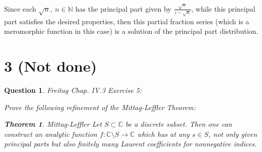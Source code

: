 \documentclass{article}
\newtheorem{theorem}{Theorem}
\newtheorem{question}{Question}
\begin{document}
\hfil

Since each $\sqrt{n},\ n\in\mathbb{N}$ has the principal part given by $\frac{\sqrt{n}}{z-\sqrt{n}}$, while this principal part satisfies the desired properties, then this partial fraction series (which is a meromorphic function in this case) is a solution of the principal part distribution.

\begin{comment}
\hfil

Lastly, given the above partial fraction series, it only has simple poles at all $\sqrt{n}$ (where $n\in\mathbb{N}$); also, if we analyze the residue at each point, we get:
$$\forall v\in \mathbb{N},\quad f(z)=\sum_{n=1}^{\infty}\left(\frac{\sqrt{n}}{z-\sqrt{n}}+\sum_{k=0}^{3}\left(\frac{z}{\sqrt{n}}\right)^k\right) = \frac{\sqrt{v}}{z-\sqrt{v}}+\sum_{k=0}^{3}\left(\frac{z}{\sqrt{v}}\right)^k+\sum_{n=1,n\neq v}^{\infty}\left(\frac{\sqrt{n}}{z-\sqrt{n}}+\sum_{k=0}^{3}\left(\frac{z}{\sqrt{n}}\right)^k\right)$$

$$Res(f(z);\sqrt{v})=\lim_{z\rightarrow\sqrt{v}}(z-\sqrt{v})f(z)$$
$$=\lim_{z\rightarrow\sqrt{v}}(z-\sqrt{v})\frac{\sqrt{v}}{z-\sqrt{v}}+(z-\sqrt{v})\left[\sum_{k=0}^{3}\left(\frac{z}{\sqrt{v}}\right)^k+\sum_{n=1,n\neq v}^{\infty}\left(\frac{\sqrt{n}}{z-\sqrt{n}}+\sum_{k=0}^{3}\left(\frac{z}{\sqrt{n}}\right)^k\right)\right] = \sqrt{v}$$
(Since the second sum is defined at $z=\sqrt{v}$ due to the normal convergence of the series, then the second term converges to $0$, while the first term converges to $\sqrt{v}$).

Hence, the above series is one of the meromorphic functions satisfying the desired property.
\end{comment}

\break

\section*{3 (Not done)}
\begin{myBox}[]{}
    \begin{question}
        Freitag Chap. IV.3 Exercise 5:

        Prove the following refinement of the Mittag-Leffler Theorem:
        \begin{theorem}{Mittag-Leffler}
            Let $S\subset \mathbb{C}$ be a discrete subset. Then one can construct an analytic function $f:\mathbb{C}\setminus S\rightarrow \mathbb{C}$
            which has at any $s\in S$, not only given principal parts but also finitely many Laurent coefficients for nonnegative indices.
        \end{theorem}
    \end{question}
\end{myBox}
\end{document}
